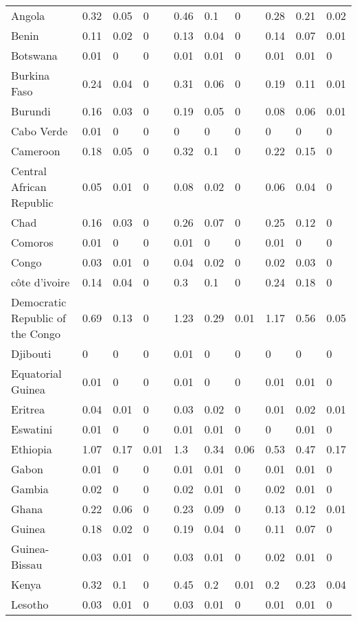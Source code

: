 \begin{longtable}[t]{llllllllll}
Angola & 0.32 & 0.05 & 0 & 0.46 & 0.1 & 0 & 0.28 & 0.21 & 0.02\\
Benin & 0.11 & 0.02 & 0 & 0.13 & 0.04 & 0 & 0.14 & 0.07 & 0.01\\
Botswana & 0.01 & 0 & 0 & 0.01 & 0.01 & 0 & 0.01 & 0.01 & 0\\
Burkina Faso & 0.24 & 0.04 & 0 & 0.31 & 0.06 & 0 & 0.19 & 0.11 & 0.01\\
Burundi & 0.16 & 0.03 & 0 & 0.19 & 0.05 & 0 & 0.08 & 0.06 & 0.01\\
Cabo Verde & 0.01 & 0 & 0 & 0 & 0 & 0 & 0 & 0 & 0\\
Cameroon & 0.18 & 0.05 & 0 & 0.32 & 0.1 & 0 & 0.22 & 0.15 & 0\\
Central African Republic & 0.05 & 0.01 & 0 & 0.08 & 0.02 & 0 & 0.06 & 0.04 & 0\\
Chad & 0.16 & 0.03 & 0 & 0.26 & 0.07 & 0 & 0.25 & 0.12 & 0\\
Comoros & 0.01 & 0 & 0 & 0.01 & 0 & 0 & 0.01 & 0 & 0\\
Congo & 0.03 & 0.01 & 0 & 0.04 & 0.02 & 0 & 0.02 & 0.03 & 0\\
côte d'ivoire & 0.14 & 0.04 & 0 & 0.3 & 0.1 & 0 & 0.24 & 0.18 & 0\\
Democratic Republic of the Congo & 0.69 & 0.13 & 0 & 1.23 & 0.29 & 0.01 & 1.17 & 0.56 & 0.05\\
Djibouti & 0 & 0 & 0 & 0.01 & 0 & 0 & 0 & 0 & 0\\
Equatorial Guinea & 0.01 & 0 & 0 & 0.01 & 0 & 0 & 0.01 & 0.01 & 0\\
Eritrea & 0.04 & 0.01 & 0 & 0.03 & 0.02 & 0 & 0.01 & 0.02 & 0.01\\
Eswatini & 0.01 & 0 & 0 & 0.01 & 0.01 & 0 & 0 & 0.01 & 0\\
Ethiopia & 1.07 & 0.17 & 0.01 & 1.3 & 0.34 & 0.06 & 0.53 & 0.47 & 0.17\\
Gabon & 0.01 & 0 & 0 & 0.01 & 0.01 & 0 & 0.01 & 0.01 & 0\\
Gambia & 0.02 & 0 & 0 & 0.02 & 0.01 & 0 & 0.02 & 0.01 & 0\\
Ghana & 0.22 & 0.06 & 0 & 0.23 & 0.09 & 0 & 0.13 & 0.12 & 0.01\\
Guinea & 0.18 & 0.02 & 0 & 0.19 & 0.04 & 0 & 0.11 & 0.07 & 0\\
Guinea-Bissau & 0.03 & 0.01 & 0 & 0.03 & 0.01 & 0 & 0.02 & 0.01 & 0\\
Kenya & 0.32 & 0.1 & 0 & 0.45 & 0.2 & 0.01 & 0.2 & 0.23 & 0.04\\
Lesotho & 0.03 & 0.01 & 0 & 0.03 & 0.01 & 0 & 0.01 & 0.01 & 0\\

\end{longtable}
